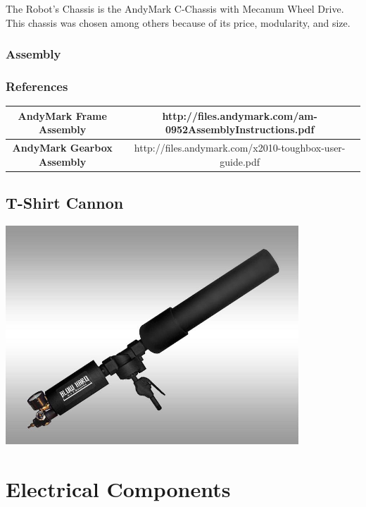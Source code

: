 \documentclass[letterpaper,12pt]{article}
\begin{document}
The Robot's Chassis is the AndyMark C-Chassis with Mecanum Wheel Drive. This
chassis was chosen among others because of its price, modularity, and size.

\subsubsection{Assembly}
\subsubsection{References}

\begin{table}[h!]
  \begin{tabular}{| c | c |}
    \hline
    \textbf{AndyMark Frame Assembly} &  http://files.andymark.com/am-0952AssemblyInstructions.pdf\\
    \hline
    \textbf{AndyMark Gearbox Assembly} &  http://files.andymark.com/x2010-toughbox-user-guide.pdf\\
    \hline
  \end{tabular}
  \label{tab:fire_cmd_msg}
\end{table}

\subsection{T-Shirt Cannon}
\begin{center}
    \includegraphics[width=11cm]{pics/cannon/blowhard_cannon.jpg}
\end{center}

\section{Electrical Components}
\end{document}
